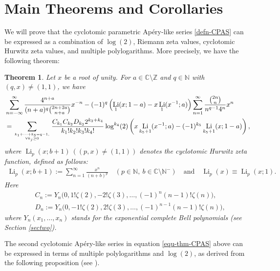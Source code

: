 \documentclass[11pt]{article}
\let\oldsection\section
\renewcommand\section{\setcounter{equation}{0}\oldsection}
\DeclareMathOperator{\Li}{Li}
\def\N{\mathbb{N}}
\def\Z{\mathbb{Z}}
\theoremstyle{plain}
\newtheorem{thm}{Theorem}[section]
\theoremstyle{definition}
\begin{document}
\section{Main Theorems and Corollaries}
We will prove that the cyclotomic parametric Ap\'ery-like series \eqref{defn-CPAS} can be expressed as a combination of $\log(2)$, Riemann zeta values, cyclotomic Hurwitz zeta values, and multiple polylogarithms. More precisely, we have the following theorem:
\begin{thm}\label{thm-CPAS} Let $x$ be a root of unity. For $a\in \mathbb{C}\setminus \Z$ and $q\in \N$ with $(q,x)\neq (1,1)$, we have
\begin{align}\label{equ-thm-CPAS}
&\sum_{n=-\infty}^\infty \frac{4^{n+a}}{(n+a)^q\binom{2n+2a}{n+a}}x^{-n}-(-1)^q\left(\Li_1(x;1-a)-x\Li_1(x^{-1};a)\right) \sum_{n=1}^\infty \frac{\binom{2n}{n}}{n^{q-1}4^n}x^n\nonumber\\
&=\sum_{k_1+\cdots+k_5=q-1,\atop \forall k_j\geq 0} \frac{C_{k_1}C_{k_2}D_{k_3}2^{k_3+k_4}}{k_1!k_2!k_3!k_4!}\log^{k_4}(2)\left(x\Li_{k_5+1}(x^{-1};a)-(-1)^{k_5}\Li_{k_5+1}(x;1-a)\right),
\end{align}
where $\Li_{p}(x;b+1)\ ((p,x)\neq (1,1))$ denotes the \emph{cyclotomic Hurwitz zeta function}, defined as follows:
\begin{align}
\Li_{p}(x;b+1):= \sum_{n=1}^\infty \frac{x^n}{(n+b)^p}\quad(p\in\N,\ b\in \mathbb{C}\setminus \N^-)\quad\text{and}\quad \Li_p(x)\equiv \Li_{p}(x;1).
\end{align}
Here
\begin{align}
&C_n:=Y_n\Big(0,1!\zeta(2),-2!\zeta(3),\ldots,(-1)^n(n-1)!\zeta(n)\Big),\label{defn-C-squ}\\
&D_n:=Y_n\Big(0,-1!\zeta(2),2!\zeta(3),\ldots,(-1)^{n-1}(n-1)!\zeta(n)\Big),\label{defn-D-squ}
\end{align}
where $Y_n(x_1,\ldots,x_n)$ stands for the \emph{exponential complete Bell polynomials} (see Section \ref{sectwo}).
\end{thm}
The second cyclotomic Ap\'ery-like series in equation \eqref{equ-thm-CPAS} above can be expressed in terms of multiple polylogarithms and $\log(2)$, as derived from the following proposition (see \cite[Theorem 3.8]{WLX2022}).
\end{document}
